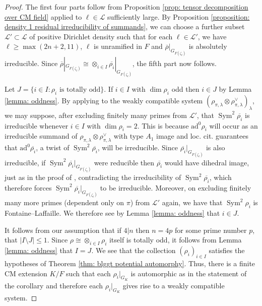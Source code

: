 \documentclass{amsart}
\theoremstyle{definition}
\numberwithin{equation}{section} %
\newcommand{\Sym}{\operatorname{Sym}}
\newcommand{\mc}[1]{\mathcal{#1}}
\newcommand{\ol}[1]{\overline{#1}}
\begin{document}
\begin{proof}
The first four parts follow from Proposition \ref{prop: tensor decomposition over CM field} applied to $\ell \in \mathcal{L}$ sufficiently large.
By Proposition \ref{proposition: density 1 residual irreducibility of summands}, we can choose a further subset $\mathcal{L}' \subset \mathcal{L}$ of positive Dirichlet density such that for each $\ell \in \mathcal{L}'$, we have $\ell \geq \max(2n+2,11)$, $\ell$ is unramified in $F$ and $\overline{\rho}|_{G_{F(\zeta_\ell)}}$ is absolutely irreducible.
Since $\overline{\rho}|_{G_{F(\zeta_\ell)}} \cong \otimes_{i \in I} \overline{\rho_i}|_{G_{F(\zeta_\ell)}}$, the fifth part now follows.

Let $J = \{i \in I: \rho_i \text{ is totally odd}\}$.
If $i \in I$ with $\dim \rho_i$ odd then $i \in J$ by Lemma \ref{lemma: oddness}.
By applying \cite[Theorem 1.2]{Hui23} to the weakly compatible system $(\rho_{\pi,\lambda} \otimes \rho_{\pi,\lambda}^\vee)_\lambda$, we may suppose, after excluding finitely many primes from $\mathcal{L}'$, that $\Sym^2 \overline{\rho_i}$ is irreducible whenever $i \in I$ with $\dim \rho_i = 2$.
This is because $\mathrm{ad}^0 \rho_i$ will occur as an irreducible summand of $\rho_{\pi,\lambda} \otimes \rho_{\pi,\lambda}^\vee$ with type $A_1$ image and loc. cit. guarantees that $\mathrm{ad}^0 \ol{\rho_i}$, a twist of $\Sym^2 \overline{\rho_i}$, will be irreducible.
Since $\ol{\rho_i}|_{G_{F(\zeta_\ell)}}$ is also irreducible, if $\Sym^2 \overline{\rho_i}|_{G_{F(\zeta_\ell)}}$ were reducible then $\overline{\rho_i}$ would have dihedral image, just as in the proof of \cite[Theorem 3.2]{CEG22}, contradicting the irreducibility of $\Sym^2 \overline{\rho_i}$, which therefore forces $\Sym^2 \overline{\rho_i}|_{G_{F(\zeta_\ell)}}$ to be irreducible.
Moreover, on excluding finitely many more primes (dependent only on $\pi$) from $\mc{L}'$ again, we have that $\Sym^2 \rho_i$ is Fontaine--Laffaille.
We therefore see by Lemma \ref{lemma: oddness} that $i \in J$.

It follows from our assumption that if $4|n$ then $n = 4p$ for some prime number $p$, that $|I \setminus J| \leq 1$.
Since $\rho \cong \otimes_{i \in I} \rho_i$ itself is totally odd, it follows from Lemma \ref{lemma: oddness} that $I = J$.
We see that the collection $(\rho_i)_{i \in I}$ satisfies the hypotheses of Theorem \ref{thm: blggt potential automorphy}.
Thus, there is a finite CM extension $K/F$ such that each $\rho_i|_{G_K}$ is automorphic as in the statement of the corollary and therefore each $\rho_i|_{G_K}$ gives rise to a weakly compatible system.
\end{proof}
\end{document}
